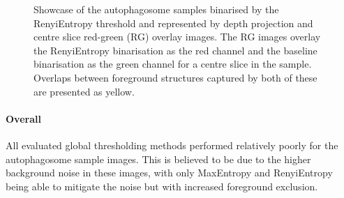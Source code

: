 \begin{figure}
	\caption[Showcase of the autophagosome samples binarised by the RenyiEntropy threshold and represented by depth projection and red-green overlay images.]{Showcase of the autophagosome samples binarised by the RenyiEntropy threshold and represented by depth projection and centre slice red-green (RG) overlay images. The RG images overlay the RenyiEntropy binarisation as the red channel and the baseline binarisation as the green channel for a centre slice in the sample. Overlaps between foreground structures captured by both of these are presented as yellow.}
	\label{fig:auto_RenyiEntropy}
\end{figure}

\paragraph{Overall} All evaluated global thresholding methods performed relatively poorly for the autophagosome sample images. This is believed to be due to the higher background noise in these images, with only MaxEntropy and RenyiEntropy being able to mitigate the noise but with increased foreground exclusion.

